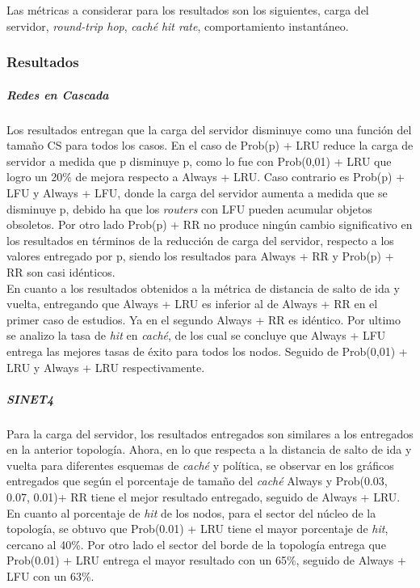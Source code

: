 \documentclass[12pt]{ociamthesis}  %
\begin{document}
Las métricas a considerar para los resultados son los siguientes, carga del servidor, \textit{round-trip hop}, \textit{caché} \textit{hit rate}, comportamiento instantáneo.

\subsubsection{Resultados}

\subparagraph{Redes en Cascada}
Los resultados entregan que la carga del servidor disminuye como una función del tamaño CS para todos los casos. En el caso de Prob(p) + LRU reduce la carga de servidor a medida que p disminuye p, como lo fue con Prob(0,01) + LRU que logro un 20\% de mejora respecto a Always + LRU. Caso contrario es Prob(p) + LFU y Always + LFU, donde la carga del servidor aumenta a medida que se disminuye p, debido ha que los \textit{routers} con LFU pueden acumular objetos obsoletos. Por otro lado Prob(p) + RR no produce ningún cambio significativo en los resultados en términos de la reducción de carga del servidor, respecto a los valores entregado por p, siendo los resultados para Always + RR y Prob(p) + RR son casi idénticos.\\

En cuanto a los resultados obtenidos a la métrica de distancia de salto de ida y vuelta, entregando que Always + LRU es inferior al de Always + RR en el primer caso de estudios. Ya en el segundo Always + RR es idéntico. Por ultimo se analizo la tasa de \textit{hit} en \textit{caché}, de los cual se concluye que Always + LFU entrega las mejores tasas de éxito para todos los nodos. Seguido de Prob(0,01) + LRU y Always + LRU respectivamente. 

\subparagraph{SINET4}
Para la carga del servidor, los resultados entregados son similares a los entregados en la anterior topología. Ahora, en lo que respecta a la distancia de salto de ida y vuelta para diferentes esquemas de \textit{caché} y política, se  observar en los gráficos entregados que según el porcentaje de tamaño del \textit{caché} Always y  Prob(0.03, 0.07, 0.01)+ RR tiene el mejor resultado entregado, seguido de Always + LRU.\\

En cuanto al  porcentaje de \textit{hit} de los nodos, para el sector del núcleo de la topología, se obtuvo que Prob(0.01) + LRU tiene el mayor porcentaje de \textit{hit}, cercano al 40\%. Por otro lado el sector del borde de la topología entrega que Prob(0.01) + LRU entrega el mayor resultado con un 65\%, seguido de Always + LFU con un 63\%.\\
\end{document}
